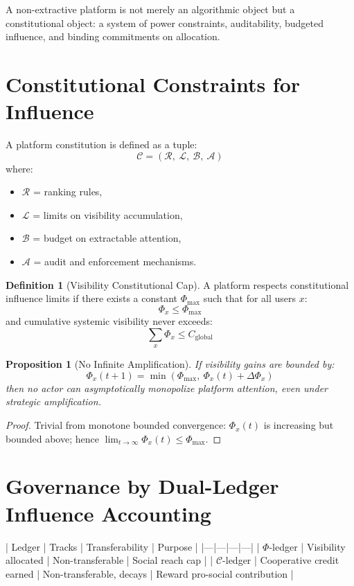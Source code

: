 \documentclass[11pt,a4paper]{article}
\theoremstyle{plain}
\newtheorem{proposition}{Proposition}[section]
\theoremstyle{definition}
\newtheorem{definition}{Definition}[section]
\theoremstyle{remark}
\begin{document}
A non-extractive platform is not merely an algorithmic object but a constitutional object: a system of power constraints, auditability, budgeted influence, and binding commitments on allocation.

\section{Constitutional Constraints for Influence}
A platform constitution is defined as a tuple:
\[
\mathcal{C} = (\mathcal{R},\ \mathcal{L},\ \mathcal{B},\ \mathcal{A})
\]
where:
\begin{itemize}
  \item $\mathcal{R}$ = ranking rules,
  \item $\mathcal{L}$ = limits on visibility accumulation,
  \item $\mathcal{B}$ = budget on extractable attention,
  \item $\mathcal{A}$ = audit and enforcement mechanisms.
\end{itemize}

\begin{definition}[Visibility Constitutional Cap]
A platform respects constitutional influence limits if there exists a constant $\Phi_{\max}$ such that for all users $x$:
\[
\Phi_x \le \Phi_{\max}
\]
and cumulative systemic visibility never exceeds:
\[
\sum_x \Phi_x \le C_{\text{global}}
\]
\end{definition}

\begin{proposition}[No Infinite Amplification]
If visibility gains are bounded by:
\[
\Phi_x(t+1) = \min(\Phi_{\max},\ \Phi_x(t) + \Delta \Phi_x)
\]
then no actor can asymptotically monopolize platform attention, even under strategic amplification.
\end{proposition}

\begin{proof}
Trivial from monotone bounded convergence: $\Phi_x(t)$ is increasing but bounded above; hence $\lim_{t \to \infty} \Phi_x(t) \le \Phi_{\max}$.
\end{proof}

\section{Governance by Dual-Ledger Influence Accounting}

| Ledger | Tracks | Transferability | Purpose |
|---|---|---|---|
| $\Phi$-ledger | Visibility allocated | Non-transferable | Social reach cap |
| $\mathcal{C}$-ledger | Cooperative credit earned | Non-transferable, decays | Reward pro-social contribution |
\end{document}

